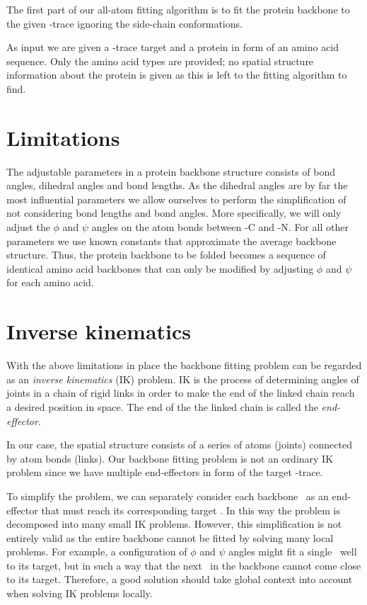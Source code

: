 The first part of our all-atom fitting algorithm is to fit the protein backbone to the given \Ca-trace ignoring the side-chain conformations.

As input we are given a \Ca-trace target and a protein in form of an amino acid sequence.
Only the amino acid types are provided; no spatial structure information about the protein is given as this is left to the fitting algorithm to find.


\section{Limitations}
The adjustable parameters in a protein backbone structure consists of bond angles, dihedral angles and bond lengths.
As the dihedral angles are by far the most influential parameters we allow ourselves to perform the simplification of not considering bond lengths and bond angles.
More specifically, we will only adjust the $\phi$ and $\psi$ angles on the atom bonds between \Ca-C and \Ca-N.
For all other parameters we use known constants that approximate the average backbone structure.
Thus, the protein backbone to be folded becomes a sequence of identical amino acid backbones that can only be modified by adjusting $\phi$ and $\psi$ for each amino acid.


\section{Inverse kinematics}
With the above limitations in place the backbone fitting problem can be regarded as an \emph{inverse kinematics} (IK) problem.
IK is the process of determining angles of joints in a chain of rigid links in order to make the end of the linked chain reach a desired position in space.
The end of the the linked chain is called the \emph{end-effector}.

In our case, the spatial structure consists of a series of atoms (joints) connected by atom bonds (links).
Our backbone fitting problem is not an ordinary IK problem since we have multiple end-effectors in form of the target \Ca-trace.

To simplify the problem, we can separately consider each backbone \Ca\ as an end-effector that must reach its corresponding target \Ca.
In this way the problem is decomposed into many small IK problems.
However, this simplification is not entirely valid as the entire backbone cannot be fitted by solving many local problems.
For example, a configuration of $\phi$ and $\psi$ angles might fit a single \Ca\ well to its target, but in such a way that the next \Ca\ in the backbone cannot come close to its target.
Therefore, a good solution should take global context into account when solving IK problems locally. 

